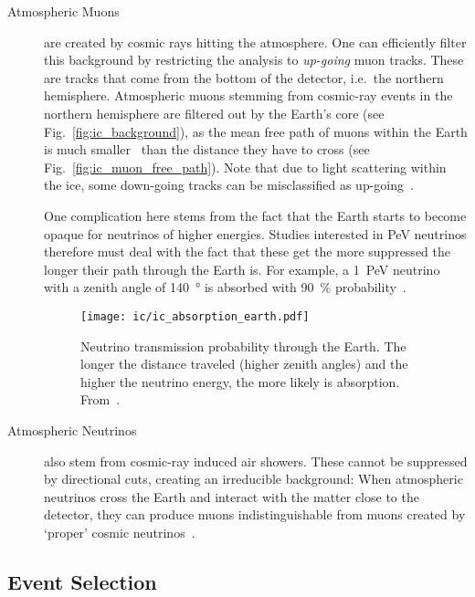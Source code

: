 \begin{description}
    \item[Atmospheric Muons] are created by cosmic rays hitting the atmosphere. One can efficiently filter this background by restricting the analysis to \textit{up-going} muon tracks. These are tracks that come from the bottom of the detector, i.e.\ the northern hemisphere. Atmospheric muons stemming from cosmic-ray events in the northern hemisphere are filtered out by the Earth's core (see Fig.~\ref{fig:ic_background}), as the mean free path of muons within the Earth is much smaller~ than the distance they have to cross (see Fig.~\ref{fig:ic_muon_free_path}). Note that due to light scattering within the ice, some down-going tracks can be misclassified as up-going~.

          One complication here stems from the fact that the Earth starts to become opaque for neutrinos of higher energies. Studies interested in \si{\peta\eV} neutrinos therefore must deal with the fact that these get the more suppressed the longer their path through the Earth is. For example, a \SI{1}{\peta\eV} neutrino with a zenith angle of \SI{140}{\degree} is absorbed with \SI{90}{\percent} probability~.

          \begin{figure}[htb]
              \texttt{[image: ic/ic\_absorption\_earth.pdf]}
              \caption[Neutrino absorption in the Earth]{Neutrino transmission probability through the Earth. The longer the distance traveled (higher zenith angles) and the higher the neutrino energy, the more likely is absorption. From~\cite{Aartsen2017c}.}
          \end{figure}

    \item[Atmospheric Neutrinos] also stem from cosmic-ray induced air showers. These cannot be suppressed by directional cuts, creating an irreducible background: When atmospheric neutrinos cross the Earth and interact with the matter close to the detector, they can produce muons indistinguishable from muons created by `proper' cosmic neutrinos~\cite{Ahlers2018a}.

\end{description}

\subsection{Event Selection}\label{ic_event_selection}

